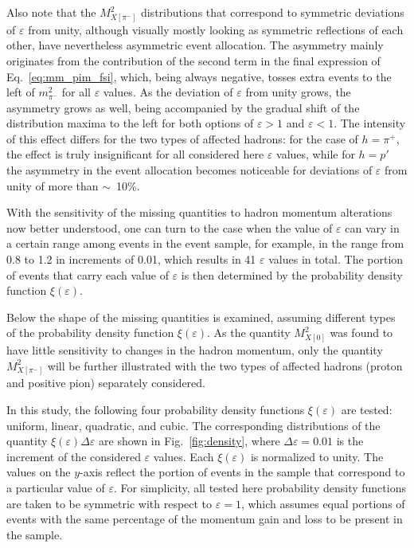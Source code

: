 Also note that the $M_{X[\pi^{-}]}^{2}$ distributions that correspond to symmetric deviations of $\varepsilon$ from unity, although visually mostly looking as symmetric reflections of each other, have nevertheless asymmetric event allocation. The asymmetry mainly originates from the contribution of the second term in the final expression of Eq.~\eqref{eq:mm_pim_fsi}, which, being always negative, tosses extra events to the left of $m_{\pi^{-}}^{2}$ for all $\varepsilon$ values. As the deviation of $\varepsilon$ from unity grows, the asymmetry grows as well, being accompanied by the gradual shift of the distribution maxima to the left for both options of $\varepsilon > 1$ and $\varepsilon < 1$. The intensity of this effect differs for the two types of affected hadrons: for the case of $h=\pi^{+}$, the effect is truly insignificant for all considered here $\varepsilon$ values, while for $h=p'$ the asymmetry in the event allocation becomes noticeable for deviations of $\varepsilon$ from unity of more than $\sim$~10\%.



With the sensitivity of the missing quantities to hadron momentum alterations now better understood, one can turn to the case when the value of $\varepsilon$ can vary in a certain range among events in the event sample, for example, in the range from 0.8 to 1.2 in increments of 0.01, which results in 41 $\varepsilon$ values in total. The portion of events that carry each value of $\varepsilon$ is then determined by the probability density function $\xi(\varepsilon)$. 


Below the shape of the missing quantities is examined, assuming different types of the probability density function $\xi(\varepsilon)$. As the quantity $M_{X[0]}^{2}$ was found to have little sensitivity to changes in the hadron momentum, only the quantity $M_{X[\pi^{-}]}^{2}$ will be further illustrated with the two types of affected hadrons (proton and positive pion) separately considered.


In this study, the following four probability density functions $\xi(\varepsilon)$ are tested: uniform, linear, quadratic, and cubic. The corresponding distributions of the quantity $\xi(\varepsilon)\Delta\varepsilon$ are shown in Fig.~\ref{fig:density}, where $\Delta\varepsilon=0.01$ is the increment of the considered $\varepsilon$ values. Each $\xi(\varepsilon)$ is normalized to unity. The values on the $y$-axis reflect the portion of events in the sample that correspond to a particular value of $\varepsilon$. For simplicity, all tested here probability density functions are taken to be symmetric with respect to $\varepsilon=1$, which assumes equal portions of events with the same percentage of the momentum gain and loss to be present in the sample.

